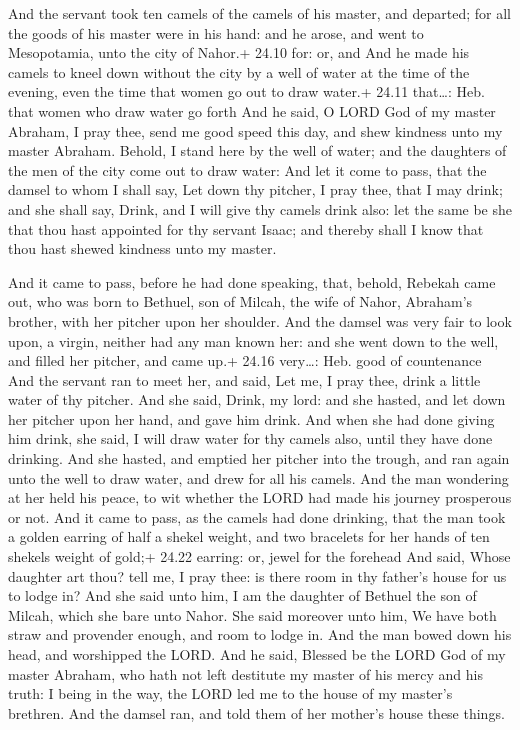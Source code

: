  And the servant took ten camels of the camels of his
master, and departed; for all the goods of his master were in his hand:
and he arose, and went to Mesopotamia, unto the city of Nahor.+ 24.10
for: or, and  And he made his camels to kneel down without
the city by a well of water at the time of the evening, even the time
that women go out to draw water.+ 24.11 that\ldots: Heb. that women who
draw water go forth  And he said, O LORD God of my master
Abraham, I pray thee, send me good speed this day, and shew kindness
unto my master Abraham.  Behold, I stand here by the well
of water; and the daughters of the men of the city come out to draw
water:  And let it come to pass, that the damsel to whom I
shall say, Let down thy pitcher, I pray thee, that I may drink; and she
shall say, Drink, and I will give thy camels drink also: let the same be
she that thou hast appointed for thy servant Isaac; and thereby shall I
know that thou hast shewed kindness unto my master.

 And it came to pass, before he had done speaking, that,
behold, Rebekah came out, who was born to Bethuel, son of Milcah, the
wife of Nahor, Abraham's brother, with her pitcher upon her shoulder.
 And the damsel was very fair to look upon, a virgin,
neither had any man known her: and she went down to the well, and filled
her pitcher, and came up.+ 24.16 very\ldots: Heb. good of countenance
 And the servant ran to meet her, and said, Let me, I pray
thee, drink a little water of thy pitcher.  And she said,
Drink, my lord: and she hasted, and let down her pitcher upon her hand,
and gave him drink.  And when she had done giving him
drink, she said, I will draw water for thy camels also, until they have
done drinking.  And she hasted, and emptied her pitcher
into the trough, and ran again unto the well to draw water, and drew for
all his camels.  And the man wondering at her held his
peace, to wit whether the LORD had made his journey prosperous or not.
 And it came to pass, as the camels had done drinking, that
the man took a golden earring of half a shekel weight, and two bracelets
for her hands of ten shekels weight of gold;+ 24.22 earring: or, jewel
for the forehead  And said, Whose daughter art thou? tell
me, I pray thee: is there room in thy father's house for us to lodge in?
 And she said unto him, I am the daughter of Bethuel the
son of Milcah, which she bare unto Nahor.  She said
moreover unto him, We have both straw and provender enough, and room to
lodge in.  And the man bowed down his head, and worshipped
the LORD.  And he said, Blessed be the LORD God of my
master Abraham, who hath not left destitute my master of his mercy and
his truth: I being in the way, the LORD led me to the house of my
master's brethren.  And the damsel ran, and told them of
her mother's house these things.

